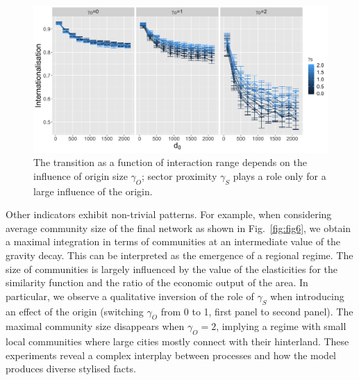 \documentclass[10pt,letterpaper]{article}
\begin{document}
\begin{figure}
    \includegraphics[width=\linewidth]{figures/Fig5.png}
    \vspace{2cm}
    \caption{The transition as a function of interaction range depends on the influence of origin size $\gamma_O$; sector proximity $\gamma_S$ plays a role only for a large influence of the origin.\label{fig:fig5}}
\end{figure}


Other indicators exhibit non-trivial patterns. For example, when considering average community size of the final network as shown in Fig.~\ref{fig:fig6}, we obtain a maximal integration in terms of communities at an intermediate value of the gravity decay. This can be interpreted as the emergence of a regional regime. The size of communities is largely influenced by the value of the elasticities for the similarity function and the ratio of the economic output of the area. In particular, we observe a qualitative inversion of the role of $\gamma_S$ when introducing an effect of the origin (switching $\gamma_O$ from 0 to 1, first panel to second panel). The maximal community size disappears when $\gamma_O = 2$, implying a regime with small local communities where large cities mostly connect with their hinterland. These experiments reveal a complex interplay between processes and how the model produces diverse stylised facts.
\end{document}
